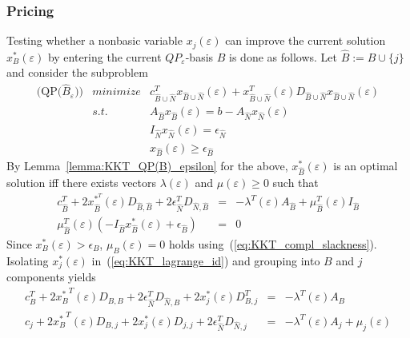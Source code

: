\documentclass[a4paper]{article}
\begin{document}
\subsubsection{Pricing}
Testing whether a nonbasic variable $x_{j}(\varepsilon)$ can improve the
current solution $x_{B}^{*}(\varepsilon)$ by entering the current
$QP_{\varepsilon}$-basis $B$ is done as follows.
Let $\hat{B}:=B \cup \{j\}$ and consider the subproblem
\begin{eqnarray*}
  \mbox{(QP($\hat{B}_{\varepsilon}$))} &minimize& c_{\hat{B} \cup \hat{N}}^{T}
    x_{\hat{B} \cup \hat{N}}(\varepsilon) +
    x_{\hat{B} \cup \hat{N}}^{T}(\varepsilon)
    D_{\hat{B} \cup \hat{N}}x_{\hat{B} \cup \hat{N}}(\varepsilon)
      \\
    & s.t. & A_{\hat{B}}x_{\hat{B}}(\varepsilon) = b - A_{\hat{N}}
    x_{\hat{N}}(\varepsilon)  \\
    & & I_{\hat{N}}x_{\hat{N}}(\varepsilon) = \epsilon_{\hat{N}} \\
    & & x_{\hat{B}}(\varepsilon) \geq \epsilon_{\hat{B}}  
\end{eqnarray*}
By Lemma~\ref{lemma:KKT_QP(B)_epsilon} for the above,
$x_{\hat{B}}^{*}(\varepsilon)$ is an optimal solution
iff there exists vectors $\lambda(\varepsilon)$ and
$\mu(\varepsilon) \geq 0$ such that
\begin{eqnarray}
\label{eq:KKT_lagrange_id}
  c_{\hat{B}}^{T} + 2x_{\hat{B}}^{*^{\scriptstyle{T}}}(\varepsilon)D_{\hat{B}, \hat{B}} +
  2\epsilon_{\hat{N}}^{T}D_{\hat{N}, \hat{B}}& = &
  -\lambda^{T}(\varepsilon)A_{\hat{B}} 
  + \mu_{\hat{B}}^{T}(\varepsilon)I_{\hat{B}}  \\
\label{eq:KKT_compl_slackness}
  \mu_{\hat{B}}^{T}(\varepsilon)
  \left(-I_{\hat{B}}x_{\hat{B}}^{*}(\varepsilon)
  + \epsilon_{\hat{B}}\right) & = & 0
\end{eqnarray}
Since $x_{B}^{*}(\varepsilon)> \epsilon_{B}$, $\mu_{B}(\varepsilon)=0$ holds
using~(\ref{eq:KKT_compl_slackness}). Isolating $x_{j}^{*}(\varepsilon)$
in~(\ref{eq:KKT_lagrange_id}) and grouping into $B$ and $j$ components yields
\begin{eqnarray}
\label{eq:KKT_lagrange_id_B}
  c_{B}^{T} + {2x_{B}^{*}}^{T}(\varepsilon)D_{B,B}
  + 2\epsilon_{\hat{N}}^{T}D_{\hat{N},B}
  + 2x_{j}^{*}(\varepsilon)D_{B,j}^{T} & = & -\lambda^{T}(\varepsilon) A_{B} \\
\label{eq:KKT_lagrange_id_j}
  c_{j} + 2{x_{B}^{*}}^{T}(\varepsilon)D_{B,j}
  + 2x_{j}^{*}(\varepsilon)D_{j,j}
  + 2\epsilon_{\hat{N}}^{T}D_{\hat{N},j} & = &
  -\lambda^{T}(\varepsilon) A_{j} + \mu_{j}(\varepsilon)
\end{eqnarray}
\end{document}

